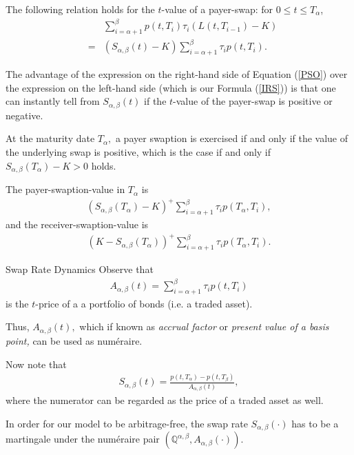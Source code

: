 	The following relation holds for the $t$-value of a payer-swap: for $ 0 \leq t
		\leq T_\alpha$,
		\begin{eqnarray}
		\label{PSO} && \sum_{i=\alpha+1}^\beta p(t,T_i) \tau_i
		(L(t,T_{i-1})-K)\\\nonumber & = &  (S_{\alpha,\beta}(t) -K)
		\sum_{i=\alpha+1}^\beta \tau_i p(t,T_i).
		\end{eqnarray}

	The advantage of the expression on the right-hand side of
	Equation (\ref{PSO}) over the expression on the left-hand side
	(which is our Formula (\ref{IRS})) is that one can instantly tell
	from $S_{\alpha,\beta}(t)$ if the $t$-value of the payer-swap is
	positive or negative.
 
	At the maturity date $T_\alpha,$ a payer swaption is
	exercised if and only if the value of the underlying swap is
	positive, which is the case if and only if
	$S_{\alpha,\beta}(T_\alpha) -K>0$ holds.
 
	The payer-swaption-value in $T_\alpha$ is
		\begin{eqnarray*}
		(S_{\alpha,\beta}(T_\alpha) -K)^+ \sum_{i=\alpha+1}^\beta \tau_i
		p(T_\alpha,T_i),
		\end{eqnarray*}
	and the receiver-swaption-value is
		\begin{eqnarray*}
		( K - S_{\alpha,\beta}(T_\alpha))^+ \sum_{i=\alpha+1}^\beta \tau_i
		p(T_\alpha,T_i).
		\end{eqnarray*}


Swap Rate Dynamics
	Observe that
		\begin{eqnarray*}
		A_{\alpha,\beta}(t) = \sum_{i=\alpha+1}^\beta \tau_i p(t,T_i)
		\end{eqnarray*}
	is the $t$-price of a a portfolio of bonds (i.e. a traded asset).

	Thus, $A_{\alpha,\beta}(t),$ which if known as {\em
	accrual factor} or {\em present value of a basis point,} can be
	used as num\'eraire.
	
	Now note that
		\begin{eqnarray*}
		S_{\alpha,\beta}(t) =
		\frac{p(t,T_\alpha)-p(t,T_\beta)}{A_{\alpha,\beta}(t)},
		\end{eqnarray*}
	where the numerator can be regarded as the price of a traded asset
	as well.

	In order for our model to be arbitrage-free, the swap rate $S_{\alpha,\beta}(\cdot)$ has to be a martingale
	under the num\'eraire pair $(\mathbb Q^{\alpha,\beta},A_{\alpha,\beta}(\cdot)).$
 
